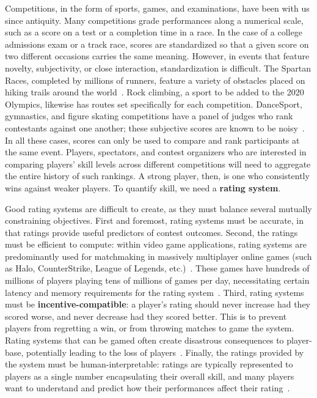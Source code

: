 Competitions, in the form of sports, games, and examinations, have been with us since antiquity. Many competitions grade performances along a numerical scale, such as a score on a test or a completion time in a race. In the case of a college admissions exam or a track race, scores are standardized so that a given score on two different occasions carries the same meaning. However, in events that feature novelty, subjectivity, or close interaction, standardization is difficult. The Spartan Races, completed by millions of runners, feature a variety of obstacles placed on hiking trails around the world~\cite{Spartan}. Rock climbing, a sport to be added to the 2020 Olympics, likewise has routes set specifically for each competition. DanceSport, gymnastics, and figure skating competitions have a panel of judges who rank contestants against one another; these subjective scores are known to be noisy~\cite{DanceSport}. 
In all these cases, scores can only be used to compare and rank participants at the same event. Players, spectators, and contest organizers who are interested in comparing players' skill levels across different competitions will need to aggregate the entire history of such rankings. A strong player, then, is one who consistently wins against weaker players. To quantify skill, we need a \textbf{rating system}.


Good rating systems are difficult to create, as they must balance several mutually constraining objectives. First and foremost, rating systems must be accurate, in that ratings provide useful predictors of contest outcomes. Second, the ratings must be efficient to compute: within video game applications, rating systems are predominantly used for matchmaking in massively multiplayer online games (such as Halo, CounterStrike, League of Legends, etc.)~\cite{HMG06, MCZ18, Y14}. These games have hundreds of millions of players playing tens of millions of games per day, necessitating certain latency and memory requirements for the rating system~\cite{AL09}. Third, rating systems must be \textbf{incentive-compatible}: a player's rating should never increase had they scored worse, and never decrease had they scored better.
This is to prevent players from regretting a win, or from throwing matches to game the system. Rating systems that can be gamed often create disastrous consequences to player-base, potentially leading to the loss of players~\cite{pokemongo}. Finally, the ratings provided by the system must be human-interpretable: ratings are typically represented to players as a single number encapsulating their overall skill, and many players want to understand and predict how their performances affect their rating~\cite{G95}.

